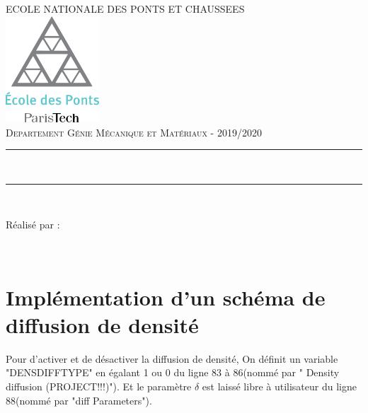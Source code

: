 \documentclass{article}
\begin{document}
\begin{titlepage}
	\thispagestyle{empty}
	\newcommand{\HRule}{\rule{\linewidth}{0.5mm}}
	\center
	\textsc{\large ECOLE NATIONALE DES PONTS ET CHAUSSEES}\\[.7cm]
	\includegraphics[width=35mm]{img/ENPC_logo.png}\\[.5cm]
	\textsc{\large Departement Génie Mécanique et Matériaux - 2019/2020}\\[0.5cm]
	
	\vspace{2cm}
	
	\HRule \\[0.4cm]
	{\LARGE {\selectfont {SPH : Projet}}
    \vspace{0.4cm}
	\HRule \\[.5cm]

\vspace{3cm}

\large Réalisé par : 

\vspace{0.5cm}

{}
\\
\vspace{1cm}


}
\end{titlepage}


\newpage
\section{Implémentation d'un schéma de diffusion de densité}

Pour d'activer et de désactiver la diffusion de densité, On définit un variable "DENSDIFFTYPE" en égalant 1 ou 0 du ligne 83 à 86(nommé par " Density diffusion (PROJECT!!!)"). Et le paramètre $\delta$ est laissé libre à utilisateur du ligne 88(nommé par "diff Parameters").\par
  
\end{document}
